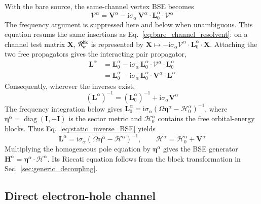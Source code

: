 \documentclass[aip,jcp,reprint,noshowkeys,superscriptaddress]{revtex4-1}
\newcommand{\ii}{\mathrm{i}}
\newcommand{\bH}{\boldsymbol{H}}
\newcommand{\bI}{\boldsymbol{I}}
\newcommand{\bL}{\boldsymbol{L}}
\newcommand{\bV}{\boldsymbol{V}}
\newcommand{\bcalV}{\boldsymbol{\mathcal V}}
\newcommand{\bX}{\boldsymbol{X}}
\newcommand{\bEta}{\boldsymbol{\eta}}
\newcommand{\bcalH}{\boldsymbol{\mathcal{H}}}
\begin{document}
With the bare source, the same-channel vertex BSE becomes
\begin{equation}
 \bcalV^{\alpha}
 =\bV^{\alpha}-\ii\sigma_{\alpha}\,\bV^{\alpha}\cdot\bL_0^{\alpha}\cdot\bcalV^{\alpha}
 \label{eq:static_vertex_BSE}
\end{equation}
The frequency argument is suppressed here and below when unambiguous.
This equation resums the same insertions as
Eq.~\eqref{eq:bare_channel_resolvent}: on a channel test matrix $\bX$,
$\mathcal R_{\alpha}^{\rm bk}$ is represented by
$\bX\mapsto-\ii\sigma_{\alpha}\bcalV^{\alpha}\cdot\bL_0^{\alpha}\cdot\bX$.
Attaching the two free propagators gives the interacting pair propagator,
\begin{align}
 \bL^{\alpha}
 &=\bL_0^{\alpha}-\ii\sigma_{\alpha}\,\bL_0^{\alpha}\cdot\bcalV^{\alpha}\cdot\bL_0^{\alpha}
 \nonumber\\
 &=\bL_0^{\alpha}-\ii\sigma_{\alpha}\,\bL_0^{\alpha}\cdot\bV^{\alpha}\cdot\bL^{\alpha}
 \label{eq:static_propagator_BSE}
\end{align}
Consequently, wherever the inverses exist,
\begin{equation}
 (\bL^{\alpha})^{-1}=(\bL_0^{\alpha})^{-1}+\ii\sigma_{\alpha}\bV^{\alpha}
 \label{eq:static_inverse_BSE}
\end{equation}
The frequency integration below gives
$\bL_0^{\alpha}=\ii\sigma_{\alpha}(\Omega\bEta^{\alpha}-\bcalH_0^{\alpha})^{-1}$,
where $\bEta^{\alpha}=\operatorname{diag}(\bI,-\bI)$ is the sector metric and
$\bcalH_0^{\alpha}$ contains the free orbital-energy blocks. Thus
Eq.~\eqref{eq:static_inverse_BSE} yields
\begin{equation}
 \bL^{\alpha}=\ii\sigma_{\alpha}(\Omega\bEta^{\alpha}-\bcalH^{\alpha})^{-1},
 \qquad \bcalH^{\alpha}=\bcalH_0^{\alpha}+\bV^{\alpha}
 \label{eq:static_interacting_resolvent}
\end{equation}
Multiplying the homogeneous pole equation by $\bEta^{\alpha}$ gives the BSE
generator $\bH^{\alpha}=\bEta^{\alpha}\cdot\bcalH^{\alpha}$. Its Riccati equation follows
from the block transformation in Sec.~\ref{sec:generic_decoupling}.

\subsection{Direct electron-hole channel}
\end{document}
